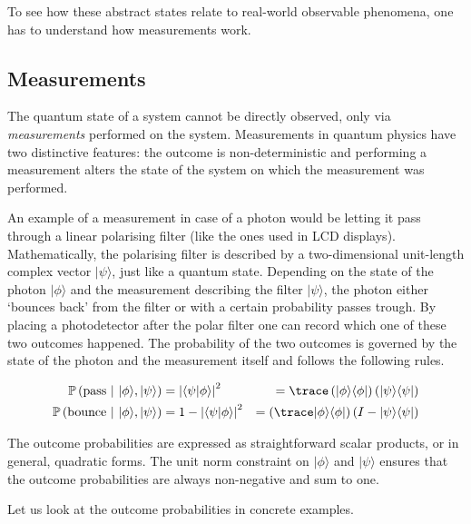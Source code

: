 To see how these abstract states relate to real-world observable phenomena, one has to understand how measurements work.

\subsection{Measurements}

The quantum state of a system cannot be directly observed, only via \emph{measurements} performed on the system. Measurements in quantum physics have two distinctive features: the outcome is non-deterministic and performing a measurement alters the state of the system on which the measurement was performed.

An example of a measurement in case of a photon would be letting it pass through a linear polarising filter (like the ones used in LCD displays). Mathematically, the polarising filter is described by a two-dimensional unit-length complex vector $\vert\psi\rangle$, just like a quantum state. Depending on the state of the photon $\vert\phi\rangle$ and the measurement describing the filter $\vert\psi\rangle$, the photon either `bounces back' from the filter or with a certain probability passes trough. By placing a photodetector after the polar filter one can record which one of these two outcomes happened. The probability of the two outcomes is governed by the state of the photon and the measurement itself and follows the following rules.

\begin{align}
	\mathbb{P}\left( \mbox{pass}\ \vert\ \vert\phi\rangle , \vert\psi\rangle \right) &= \left\vert\langle\psi\vert\phi\rangle\right\vert^2 &= \trace\left(\vert\phi\rangle\langle\phi\vert\right)\left(\vert\psi\rangle\langle\psi\vert\right) \\
	\mathbb{P}\left( \mbox{bounce}\ \vert\ \vert\phi\rangle , \vert\psi\rangle \right) &= 1 - \left\vert\langle\psi\vert\phi\rangle\right\vert^2 &= \left(\trace\vert\phi\rangle\langle\phi\vert\right)\left(I - \vert\psi\rangle\langle\psi\vert\right)
\end{align}

The outcome probabilities are expressed as straightforward scalar products, or in general, quadratic forms. The unit norm constraint on $\vert\phi\rangle$ and $\vert\psi\rangle$ ensures that the outcome probabilities are always non-negative and sum to one.

Let us look at the outcome probabilities in concrete examples.

